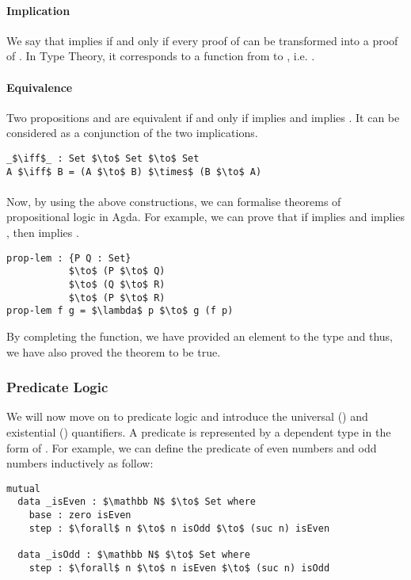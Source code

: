 \paragraph{Implication} We say that  implies  if and only
if every proof of  can be transformed into a proof of . In Type
Theory, it corresponds to a function from  to , i.e. . 

\paragraph{Equivalence} Two propositions  and
 are equivalent if and only if  implies  and  implies
. It can be considered as a conjunction of the two implications.
\begin{lstlisting}[mathescape=true,xleftmargin=.3\textwidth]
_$\iff$_ : Set $\to$ Set $\to$ Set
A $\iff$ B = (A $\to$ B) $\times$ (B $\to$ A)
\end{lstlisting} 

\paragraph{} Now, by using the above constructions, we can formalise
 theorems of propositional logic in Agda. For example, we can prove that if  implies  and
 implies , then  implies . 
\begin{lstlisting}[mathescape=true,xleftmargin=.3\textwidth]
prop-lem : {P Q : Set} 
           $\to$ (P $\to$ Q) 
           $\to$ (Q $\to$ R) 
           $\to$ (P $\to$ R)
prop-lem f g = $\lambda$ p $\to$ g (f p)
\end{lstlisting} 

\par By completing the function, we have provided an element
to the type  and thus, we have
also proved the theorem to be true. 


\subsubsection{Predicate Logic} 
\par We will now move on to predicate logic and
introduce the universal (\mb{\forall}) and existential (\mb{\exists})
quantifiers. A predicate is represented by a dependent type in the
form of . For example, we can
define the predicate of even numbers and odd numbers inductively as follow:
\begin{lstlisting}[mathescape=true,xleftmargin=.3\textwidth]
mutual
  data _isEven : $\mathbb N$ $\to$ Set where
    base : zero isEven
    step : $\forall$ n $\to$ n isOdd $\to$ (suc n) isEven

  data _isOdd : $\mathbb N$ $\to$ Set where
    step : $\forall$ n $\to$ n isEven $\to$ (suc n) isOdd
\end{lstlisting} 

